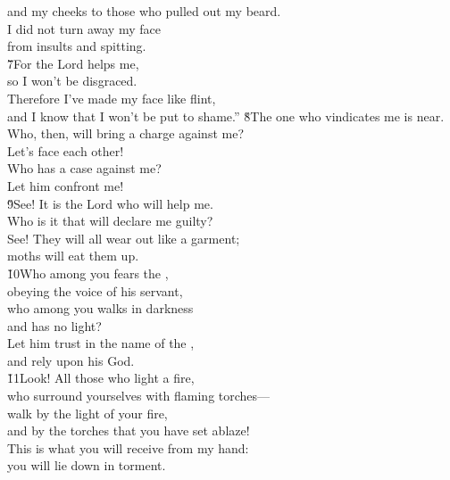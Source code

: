 \begin{poetry}
\poemll    and my cheeks to those who pulled out my beard. \\
\poeml I did not turn away my face \\
\poemll    from insults and spitting. \\
\poeml \v{7}For the Lord  helps me, \\
\poemll    so I won't be disgraced. \\
\poeml Therefore I've made my face like flint, \\
\poemll    and I know that I won't be put to shame.''
\poeml \v{8}The one who vindicates me is near. \\
\poemll    Who, then, will bring a charge against me? \\
\poemlll       Let's face each other! \\
\poeml Who has a case against me? \\
\poemll    Let him confront me! \\
\poeml \v{9}See! It is the Lord  who will help me. \\
\poemll    Who is it that will declare me guilty? \\
\poeml See! They will all wear out like a garment; \\
\poemll    moths will eat them up. \\
\poeml \v{10}Who among you fears the , \\
\poemll    obeying the voice of his servant, \\
\poeml who among you walks in darkness \\
\poemll    and has no light? \\
\poeml Let him trust in the name of the , \\
\poemll    and rely upon his God. \\
\poeml \v{11}Look! All those who light a fire, \\
\poemll    who surround yourselves with flaming torches--- \\
\poeml walk by the light of your fire, \\
\poemll    and by the torches that you have set ablaze! \\
\poeml This is what you will receive from my hand: \\
\poemll    you will lie down in torment.
\end{poetry}

